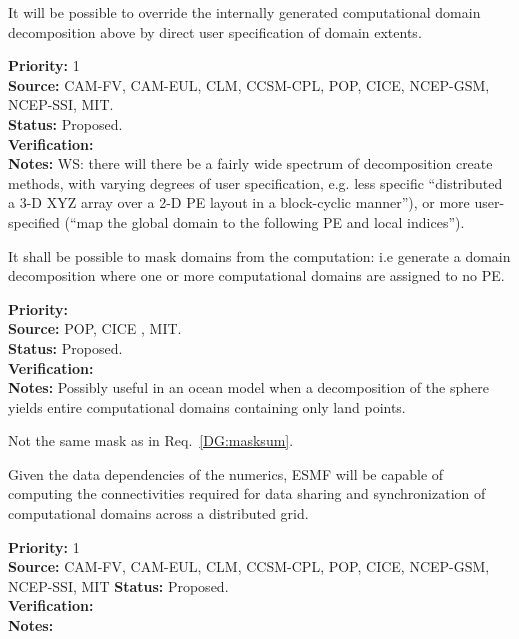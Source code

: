 
It will be possible to override the internally generated computational
domain decomposition above by direct user specification of domain
extents.

\begin{reqlist}
{\bf Priority:} 1 \\ 
{\bf Source:} CAM-FV, CAM-EUL, CLM, CCSM-CPL, POP, CICE, NCEP-GSM, NCEP-SSI, MIT. \\
{\bf Status:} Proposed. \\
{\bf Verification:} \\
{\bf Notes:} WS:  there will there be a fairly wide spectrum 
of decomposition create methods, with varying degrees of user
specification, e.g. less specific ``distributed a 3-D XYZ array 
over a 2-D PE layout in a block-cyclic manner''), or more 
user-specified (``map the global domain to the following PE 
and local indices'').

\end{reqlist}

 \label{DG:masklayout}

It shall be possible to mask domains from the computation: i.e
generate a domain decomposition where one or more computational
domains are assigned to no PE.

\begin{reqlist}
{\bf Priority:} \\
{\bf Source:} POP, CICE , MIT. \\
{\bf Status:} Proposed. \\
{\bf Verification:} \\
{\bf Notes:} Possibly useful in an ocean model when a decomposition
  of the sphere yields entire computational domains containing only
  land points.

  Not the same mask as in Req.~\ref{DG:masksum}.
\end{reqlist}


Given the data dependencies of the numerics, ESMF will be capable of
computing the connectivities required for data sharing and
synchronization of computational domains across a distributed grid.


\begin{reqlist}
{\bf Priority:} 1 \\ 
{\bf Source:} CAM-FV, CAM-EUL, CLM, CCSM-CPL, POP, CICE, NCEP-GSM, NCEP-SSI, MIT
{\bf Status:} Proposed. \\
{\bf Verification:} \\
{\bf Notes:} 

\end{reqlist}

